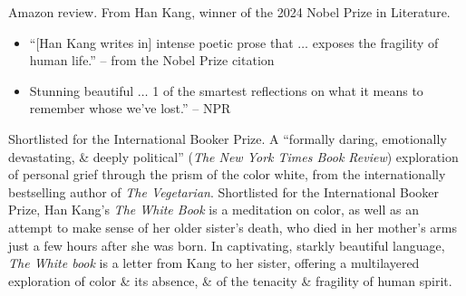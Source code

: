 \documentclass{article}
\begin{document}
\begin{enumerate}
	{\sf Amazon review.} From {\sc Han Kang}, winner of the 2024 Nobel Prize in Literature.
	\begin{itemize}
		\item ``[{\sc Han Kang} writes in] intense poetic prose that $\ldots$ exposes the fragility of human life.'' -- from the Nobel Prize citation
		\item Stunning beautiful $\ldots$ 1 of the smartest reflections on what it means to remember whose we've lost.'' -- NPR
	\end{itemize}
	Shortlisted for the International Booker Prize. A ``formally daring, emotionally devastating, \& deeply political'' ({\it The New York Times Book Review}) exploration of personal grief through the prism of the color white, from the internationally bestselling author of {\it The Vegetarian}. Shortlisted for the International Booker Prize, {\sc Han Kang}'s {\it The White Book} is a meditation on color, as well as an attempt to make sense of her older sister's death, who died in her mother's arms just a few hours after she was born. In captivating, starkly beautiful language, {\it The White book} is a letter from {\sc Kang} to her sister, offering a multilayered exploration of color \& its absence, \& of the tenacity \& fragility of human spirit.
	

\end{enumerate}
\end{document}

